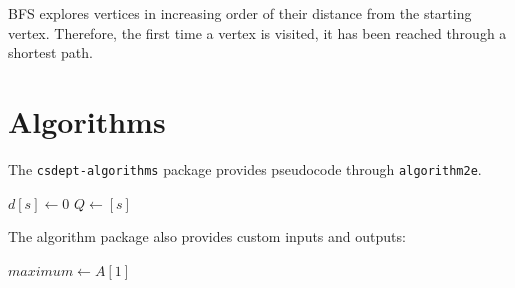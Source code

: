 \documentclass{csdept}
\begin{document}
\begin{solution}

BFS explores vertices in increasing order of their distance from
the starting vertex. Therefore, the first time a vertex is
visited, it has been reached through a shortest path.

\end{solution}

\section{Algorithms}

The \texttt{csdept-algorithms} package provides pseudocode through
\texttt{algorithm2e}.

\begin{algorithm}[H]
\caption{Breadth-First Search}



$d[s] \gets 0$\;
$Q \gets [s]$\;



\end{algorithm}

The algorithm package also provides custom inputs and outputs:

\begin{algorithm}[H]
\caption{Maximum Element}


$maximum \gets A[1]$\;



\end{algorithm}



\end{document}
